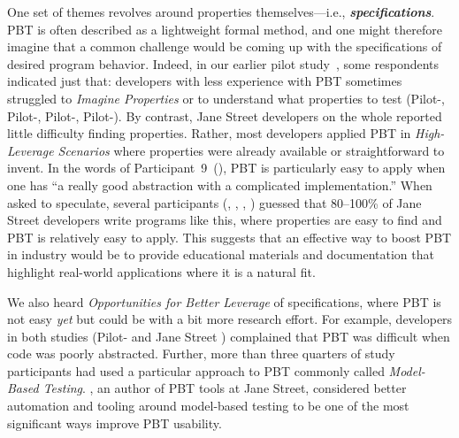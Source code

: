 \ifthemecolors{}\fi
\newcommand{\proptheme}[1]{{\ifthemecolors\color{nord-orange}\fi \em #1}}
\newcommand{\gentheme}[1]{{\ifthemecolors\color{nord-green}\fi \em #1}}
\newcommand{\evaltheme}[1]{{\ifthemecolors\color{nord-purple}\fi \em #1}}
\newcommand{\edutheme}[1]{{\ifthemecolors\color{nord-frost4}\fi \em #1}}
One set of
themes revolves around properties themselves---i.e.,
\proptheme{\normalfont \bf specifications}.
PBT is often described as a lightweight formal method, and one
might therefore imagine that a common challenge would be coming up with the
specifications of desired program behavior. Indeed, in our earlier pilot
study~\cite{goldstein_problems_2022}, some respondents indicated just that:
developers with less experience with PBT
sometimes struggled to \proptheme{Imagine
Properties} or to understand what properties to test (Pilot-,
Pilot-,
Pilot-, Pilot-).
By contrast, Jane Street developers on the whole reported
little difficulty finding
properties. Rather, most developers applied PBT in
\proptheme{High-Leverage Scenarios} where properties were already
available or straightforward to invent. In the words of
Participant~9~(), PBT is particularly easy to apply
when
one has ``a really good abstraction with a complicated implementation.''
When asked to speculate, several participants (, ,
, ) guessed
that 80--100\% of Jane Street
developers write programs like this, where properties are easy to find and
PBT is relatively easy to apply. This suggests that an effective way to
boost PBT in industry would be to provide
educational materials and documentation that highlight
real-world applications where it is a natural
fit. \iflater{}
\fi

We also heard \proptheme{Opportunities for Better
Leverage} of specifications, where PBT is not easy {\em yet} but
could be with a bit more research effort. For example, developers in
both studies (Pilot- and Jane Street ) complained
that PBT was difficult when code was poorly abstracted.  Further,
more than three
quarters of study participants had used a particular approach to PBT commonly
called \proptheme{Model-Based Testing}.  , an author of PBT tools
at Jane Street, considered better automation and tooling around model-based
testing to be one of the most significant ways improve PBT usability.

